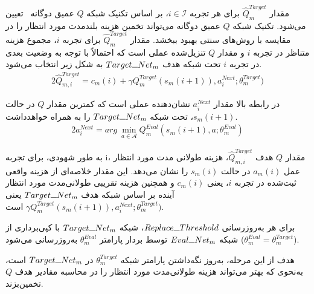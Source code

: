 مقدار $\hat{Q}_m^{Target}$ برای هر تجربه $i \in \mathcal{I}$، بر اساس تکنیک شبکه $Q$ عمیق دوگانه~\cite{wang2016dueling} تعیین می‌شود. تکنیک شبکه $Q$ عمیق دوگانه می‌تواند تخمین هزینه بلندمدت مورد انتظار را در مقایسه با روش‌های سنتی بهبود ببخشد. مقدار $\hat{Q}_m^{Target}$ برای تجربه $i$، مجموع هزینه متناظر در تجربه $i$ و مقدار $Q$ تنزیل‌شده عملی است که احتمالاً با توجه به وضعیت بعدی در تجربه $i$ تحت شبکه هدف $Target\rule{0.25cm}{0.15mm}Net_m$ ‌به شکل زیر انتخاب می‌شود.
\begin{alignat}{2}
	\hat{Q}_{m,i}^{Target} = c_m(i) + \gamma Q_m^{Target}(s_m(i+1)), a_i^{Next}; \theta_m^{Target})
	\label{24}  
\end{alignat}  

در رابطه بالا مقدار $a_i^{Next}$ نشان‌دهنده عملی است که کمترین مقدار $Q$ در حالت $s_m(i+1)$، تحت شبکه $Target\rule{0.25cm}{0.15mm}Net_m$ را به همراه خواهدداشت. 
\begin{alignat}{2}
	a_i^{Next} = arg \  \min\limits_{a \in \mathcal{A}} Q_m^{Eval}(s_m(i+1), a; \theta_m^{Eval})
	\label{25}  
\end{alignat}  





به طور شهودی، برای تجربه i، مقدار $Q$ هدف $\hat{Q}_{m,i}^{Target}$، هزینه طولانی مدت مورد انتظار عمل $a_m(i)$ در حالت $s_m(i)$‌ را نشان می‌دهد. این مقدار خلاصه‌ای از هزینه واقعی ثبت‌شده در تجربه $i$، یعنی $c_m(i)$ و همچنین هزینه تقریبی طولانی‌مدت مورد انتظار آینده بر اساس شبکه هدف $Target\rule{0.25cm}{0.15mm}Net_m$ یعنی $\gamma Q_m^{Target}(s_m(i+1)), a_i^{Next}; \theta_m^{Target})$ است. 


برای هر به‌روزرسانی $Replace\rule{0.25cm}{0.15mm}Threshold$، شبکه $Target\rule{0.25cm}{0.15mm}Net_m$ با کپی‌برداری از شبکه $Eval\rule{0.25cm}{0.15mm}Net_m$  توسط بردار پارامتر $\theta_m^{Eval}$ به‌روزرسانی می‌شود
 ($\theta_m^{Eval} = \theta_m^{Target}$).  


هدف از این مرحله، به‌روز نگه‌داشتن پارامتر شبکه $\theta_m^{Target}$ در $Target\rule{0.25cm}{0.15mm}Net_m$ است، به‌نحوی که بهتر می‌تواند هزینه طولانی‌مدت مورد انتظار را در محاسبه مقادیر هدف $Q$ تخمین‌بزند.








